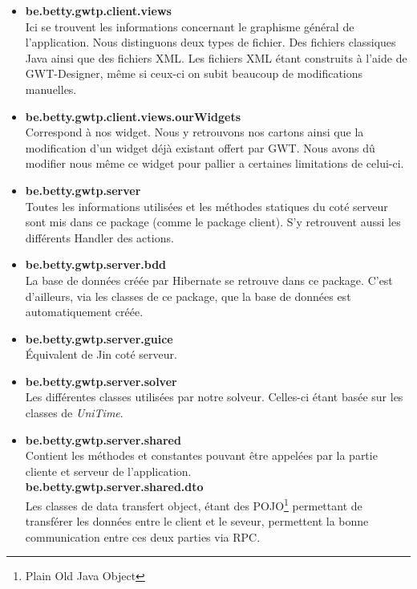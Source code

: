 \begin{itemize}
\item \textbf{be.betty.gwtp.client.views}\\
 Ici se trouvent les informations concernant le graphisme général de l'application. Nous distinguons deux types de fichier. Des fichiers classiques Java ainsi que des fichiers XML. Les fichiers XML étant construits à l'aide de GWT-Designer, même si ceux-ci on subit beaucoup de modifications manuelles.\\
 
 \item \textbf{be.betty.gwtp.client.views.ourWidgets}\\
 Correspond à nos widget. Nous y retrouvons nos cartons ainsi que la modification d'un widget déjà existant offert par GWT. Nous avons dû modifier nous même ce widget pour pallier a certaines limitations de celui-ci.\\
 
 \item \textbf{be.betty.gwtp.server}\\
 Toutes les informations utilisées et les méthodes statiques du coté serveur sont mis dans ce package (comme le package client). S'y retrouvent aussi les différents Handler des actions.\\
 
 \item \textbf{be.betty.gwtp.server.bdd}\\
  La base de données créée par Hibernate se retrouve dans ce package. C'est d'ailleurs, via les classes de ce package, que la base de données est automatiquement créée.\\
  
 \item \textbf{be.betty.gwtp.server.guice}\\
 Équivalent de Jin coté serveur.\\
 
\item \textbf{be.betty.gwtp.server.solver}\\
Les différentes classes utilisées par notre solveur. Celles-ci étant basée sur les classes de \textit{UniTime}.\\

\item \textbf{be.betty.gwtp.server.shared}\\
Contient les méthodes et constantes pouvant être appelées par la partie cliente et serveur de l'application.\\

\textbf{be.betty.gwtp.server.shared.dto}\\
Les classes de data transfert object, étant des POJO\footnote{Plain Old Java Object} permettant de transférer les données entre le client et le seveur, permettent la bonne communication entre ces deux parties via RPC.\\

\end{itemize}

